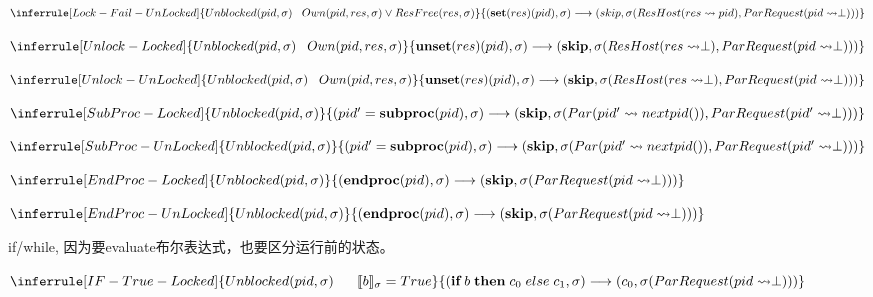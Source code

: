 \documentclass[UTF8, 8pt, a4paper ]{ctexart}
\begin{document}
\begin{small}
\begin{center}

		\kspace
		$  
		\inferrule[Lock-Fail-UnLocked]
		{Unblocked(pid, \sigma)\;\;\; Own(pid, res, \sigma) \vee ResFree(res, \sigma)}  %
		{(\textbf{set}(res)(pid), \sigma) \longrightarrow (skip, \sigma(ResHost(res \rightsquigarrow pid), ParRequest(pid\rightsquigarrow \perp)))}
		$

		
		\kspace
		$
		\inferrule[Unlock-Locked]
		{Unblocked(pid, \sigma)\;\;\; Own(pid, res, \sigma)}
		{\textbf{unset}(res)(pid), \sigma) \longrightarrow (\textbf{skip}, \sigma(ResHost(res \rightsquigarrow \perp),  ParRequest(pid\rightsquigarrow \perp)))}
		$


		\kspace
		$
		\inferrule[Unlock-UnLocked]
		{Unblocked(pid, \sigma)\;\;\; Own(pid, res, \sigma)}
		{\textbf{unset}(res)(pid), \sigma) \longrightarrow (\textbf{skip}, \sigma(ResHost(res \rightsquigarrow \perp),  ParRequest(pid\rightsquigarrow \perp)))}
		$

		\kspace
		$
		\inferrule[SubProc-Locked]
		{Unblocked(pid, \sigma)}
		{(pid' = \textbf{subproc}(pid), \sigma) \longrightarrow (\textbf{skip}, \sigma(Par(pid' \rightsquigarrow nextpid()), ParRequest(pid'\rightsquigarrow\perp)))}  %
		$

		\kspace
		$
		\inferrule[SubProc-UnLocked]
		{Unblocked(pid, \sigma)}
		{(pid' = \textbf{subproc}(pid), \sigma) \longrightarrow (\textbf{skip}, \sigma(Par(pid' \rightsquigarrow nextpid()), ParRequest(pid'\rightsquigarrow\perp)))}  %
		$

		\kspace
		$
		\inferrule[EndProc-Locked]
		{Unblocked(pid, \sigma)}  %
		{(\textbf{endproc}(pid), \sigma) \longrightarrow (\textbf{skip}, \sigma(ParRequest(pid\rightsquigarrow \perp)))}
		$

		\kspace
		$
		\inferrule[EndProc-UnLocked]
		{Unblocked(pid, \sigma)}  %
		{(\textbf{endproc}(pid), \sigma) \longrightarrow (\textbf{skip}, \sigma(ParRequest(pid\rightsquigarrow \perp)))}
		$


		if/while, 因为要evaluate布尔表达式，也要区分运行前的状态。
		
		\kspace
		$
		\inferrule[IF-True-Locked]  %
		{ Unblocked(pid, \sigma)\;\;\;\;\;\;\llbracket b \rrbracket_{\sigma} = True}
		{ (\textbf{if}\;b\;\textbf{then}\;c_0\;else\;c_1, \sigma)\longrightarrow (c_0, \sigma(ParRequest(pid\rightsquigarrow \perp)))}
		$
		

\end{center}
\end{small}
\end{document}
